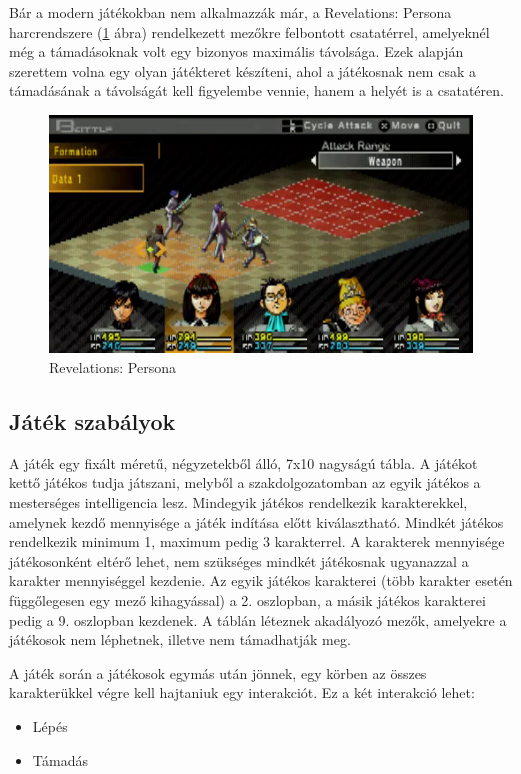 \documentclass[
]{thesis-ekf}
\theoremstyle{definition}
\theoremstyle{remark}
\begin{document}
Bár a modern játékokban nem alkalmazzák már, a Revelations: Persona harcrendszere (\ref{persona1} ábra) rendelkezett mezőkre felbontott csatatérrel, amelyeknél még a támadásoknak volt egy bizonyos maximális távolsága. Ezek alapján szerettem volna egy olyan játékteret készíteni, ahol a játékosnak nem csak a támadásának a távolságát kell figyelembe vennie, hanem a helyét is a csatatéren. \cite{Persona1,Persona1Gameplay}
\begin{figure}[h!]
	\centering
	\includegraphics[width=13cm]{./pictures/persona_psp.png}
	\caption{Revelations: Persona}
	\label{persona1}
\end{figure}

\subsection{Játék szabályok}

A játék egy fixált méretű, négyzetekből álló, 7x10 nagyságú tábla. A játékot kettő játékos tudja játszani, melyből a szakdolgozatomban az egyik játékos a mesterséges intelligencia lesz. Mindegyik játékos rendelkezik karakterekkel, amelynek kezdő mennyisége a játék indítása előtt kiválasztható. Mindkét játékos rendelkezik minimum 1, maximum pedig 3 karakterrel. A karakterek mennyisége játékosonként eltérő lehet, nem szükséges mindkét játékosnak ugyanazzal a karakter mennyiséggel kezdenie. Az egyik játékos karakterei (több karakter esetén függőlegesen egy mező kihagyással) a 2. oszlopban, a másik játékos karakterei pedig a 9. oszlopban kezdenek. A táblán léteznek akadályozó mezők, amelyekre a játékosok nem léphetnek, illetve nem támadhatják meg. 

A játék során a játékosok egymás után jönnek, egy körben az összes karakterükkel végre kell hajtaniuk egy interakciót. Ez a két interakció lehet:
\begin{itemize}
	\item Lépés
	\item Támadás
\end{itemize}
\end{document}
